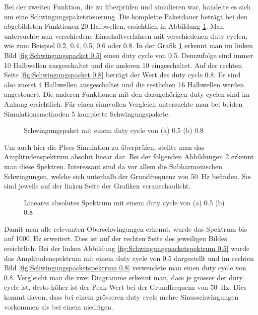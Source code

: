 Bei der zweiten Funktion, die zu überprüfen und simulieren war, handelte es sich um eine Schwingungspaketsteuerung. Die komplette Paketdauer beträgt bei den abgebildeten Funktionen 20 Halbwellen, ersichtlich in Abbildung \ref{fig:Schwingungspaket Matlab}. Man untersuchte nun verschiedene Einschaltverfahren mit verschiedenen duty cyclen, wie zum Beispiel 0.2, 0.4, 0.5, 0.6 oder 0.8. In der Grafik \ref{fig:Schwingungspaket Matlab} erkennt man im linken Bild \ref{fig:Schwingungspacket 0.5} einen duty cycle von 0.5. Demzufolge sind immer 10 Halbwellen ausgeschaltet und die anderen 10 eingeschaltet.
Auf der rechten Seite \ref{fig:Schwingungspacket 0.8} beträgt der Wert des duty cycle 0.8. Es sind also zuerst 4 Halbwellen ausgeschaltet und die restlichen 16 Halbwellen werden angesteuert. Die anderen Funktionen mit den dazugehörigen duty cyclen sind im Anhang ersichtlich. Für einen sinnvollen Vergleich untersuchte man bei beiden Simulationsmethoden 5 komplette Schwingungspakete. 

\begin{figure}[ht!]
	\centering
	\qquad
	\caption{Schwingungspaket mit einem duty cycle von (a) 0.5 (b) 0.8}
	\label{fig:Schwingungspaket Matlab}
\end{figure} 

Um auch hier die Plecs-Simulation zu überprüfen, stellte man das Amplitudenspektrum absolut linear dar. Bei der folgenden Abbildungen \ref{fig:Schwingungspaketspektrum Matlab} erkennt man diese Spektren. Interessant sind da vor allem die Subharmonischen Schwingungen, welche sich unterhalb der Grundfrequenz von \SI{50}{Hz} befinden. Sie sind jeweils auf der linken Seite der Grafiken veranschaulicht.   

\begin{figure}[ht!]
	\centering
	\qquad
	\caption{Lineares absolutes Spektrum mit einem duty cycle von (a) 0.5 (b) 0.8}
	\label{fig:Schwingungspaketspektrum Matlab}
\end{figure}


Damit man alle relevanten Oberschwingungen erkennt, wurde das Spektrum bis auf \SI{1000}{Hz} erweitert. Dies ist auf der rechten Seite des jeweiligen Bildes ersichtlich. Bei der linken Abbildung \ref{fig:Schwingungspacketspektrum 0.5} wurde das Amplitudenspektrum mit einem duty cycle von 0.5 dargestellt und im rechten Bild \ref{fig:Schwingungspacketspektrum 0.8} verwendete man einen duty cycle von 0.8. Vergleicht man die zwei Diagramme erkennt man, dass je grösser der duty cycle ist, desto höher ist der Peak-Wert bei der Grundfrequenz von \SI{50}{Hz}. Dies kommt davon, dass bei einem grösseren duty cycle mehre Sinusschwingungen vorkommen als bei einem niedrigen.


